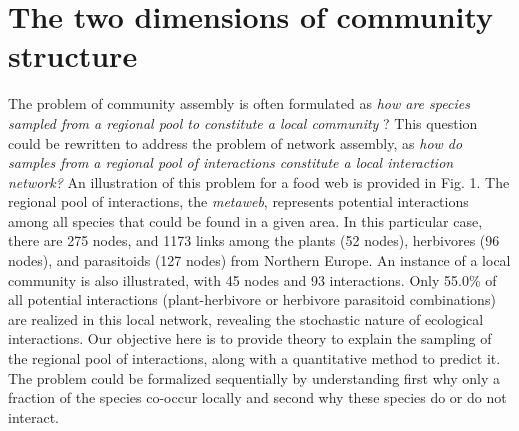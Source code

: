 \documentclass[12pt]{article}
\begin{document}
\section*{The two dimensions of community structure}

The problem of community assembly is often formulated as \textit{how are
species sampled from a regional pool to constitute a local community}
\citep{Gotzenberger2012}? This question could be rewritten to address the
problem of network assembly, as \textit{how do samples from a regional pool of
interactions constitute a local interaction network?} An illustration of this
problem for a food web is provided in Fig. 1. The regional pool of
interactions, the \emph{metaweb}, represents potential interactions among all
species that could be found in a given area. In this particular case, there
are 275 nodes, and 1173 links among the plants (52 nodes), herbivores (96
nodes), and parasitoids (127 nodes) from Northern Europe. An instance of a
local community is also illustrated, with 45 nodes and 93 interactions. Only
55.0\% of all potential interactions (plant-herbivore or herbivore parasitoid
combinations) are realized in this local network, revealing the stochastic
nature of ecological interactions. Our objective here is to provide theory to
explain the sampling of the regional pool of interactions, along with a
quantitative method to predict it. The problem could be formalized
sequentially by understanding first why only a fraction of the species co-occur locally and second why these species do or do not interact.
\end{document}
